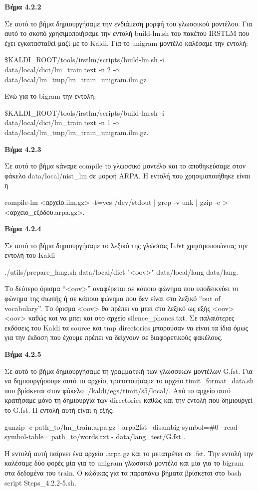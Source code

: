 \documentclass[12pt]{article}
\begin{document}
\textbf{Βήμα 4.2.2}

Σε αυτό το βήμα δημιουργήσαμε την ενδιάμεση μορφή του γλωσσικού μοντέλου.
Για αυτό το σκοπό χρησιμοποιήσαμε την εντολή build-lm.sh του πακέτου IRSTLM που έχει εγκατασταθεί μαζί με το Kaldi. 
Για το unigram μοντέλο καλέσαμε την εντολή:

\$KALDI\_ROOT/tools/irstlm/scripts/build-lm.sh -i data/local/dict/lm\_train.text -n 2 -o data/local/lm\_tmp/lm\_train\_unigram.ilm.gz

Ενώ για το bigram την εντολή: 

\$KALDI\_ROOT/tools/irstlm/scripts/build-lm.sh -i data/local/dict/lm\_train.text -n 1 -o data/local/lm\_tmp/lm\_train\_unigram.ilm.gz.

\textbf{Βήμα 4.2.3}

Σε αυτό το βήμα κάναμε compile το γλωσσικό μοντέλο και το αποθηκεύσαμε στον φάκελο data/local/nist\_lm σε μορφή ARPA. Η εντολή που χρησιμοποιήθηκε είναι η 

compile-lm <αρχείο.ilm.gz> -t=yes /dev/stdout | grep -v unk | gzip -c > <αρχειο\_εξόδου.arpa.gz>.

\textbf{Βήμα 4.2.4}

Σε αυτό το βήμα δημιουργήσαμε το λεξικό της γλώσσας L.fst χρησιμοποιώντας την εντολή του Kaldi 

./utils/prepare\_lang.sh data/local/dict "<oov>" data/local/lang data/lang. 

Το δεύτερο όρισμα “<oov>” αναφέρεται σε κάποιο φώνημα που υποδεικνύει το φώνημα της σιωπής ή σε κάποιο φώνημα που δεν είναι στο λεξικό “out of vocabulary”. Το όρισμα <oov> θα πρέπει να μπει στο λεξικό ως εξής <oov> <oov> καθώς και να μπει και στο αρχείο silence\_phones.txt. Σε παλαιότερες εκδόσεις του Kaldi τα source και tmp directories μπορούσαν να είναι τα ίδια όμως για την έκδοση που έχουμε πρέπει να δείχνουν σε διαφορετικούς φακέλους.

\textbf{Βήμα 4.2.5}

Σε αυτό το βήμα δημιουργήσαμε τη γραμματική των γλωσσικών μοντέλων G.fst. Για να δημιουργήσουμε αυτό το αρχείο, τροποποιήσαμε το αρχείο timit\_format\_data.sh που βρίσκεται στον φάκελο
./kaldi/egs/timit/s5/local/.
Από το αρχείο αυτό κρατήσαμε μόνο τη δημιουργία των directories καθώς και την εντολή που δημιουργεί το G.fst. Η εντολή αυτή είναι η εξής: 

gunzip -c path\_to/lm\_train.arpa.gz |  arpa2fst --disambig-symbol=\#0 --read-symbol-table=
path\_to/words.txt - data/lang\_test/G.fst .

Η εντολή αυτή παίρνει ένα αρχείο .arpa.gz και το μετατρέπει σε .fst. Την εντολή την καλέσαμε δύο φορές μία για το unigram γλωσσικό μοντέλο και μία για το bigram στα δεδομένα του train.
Ο κώδικας για τα παραπάνω βήματα βρίσκεται στο bash script Steps\_4.2.2-5.sh.
\end{document}
